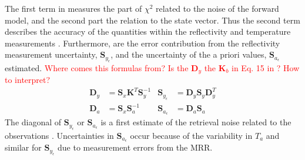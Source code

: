 %
The first term in  measures the part of $\chi^2$ related to the noise of the forward model, and the second part the relation to the state vector. Thus the second term describes the accuracy of the quantities within the reflectivity and temperature measurements \citep{rodgers_inverse_2000}.
Furthermore, are the error contribution from the reflectivity measurement uncertainty, $\mathbf{S}_{y_\epsilon}$, and the uncertainty of the a priori values, $\mathbf{S}_{a_\epsilon}$ estimated. \textcolor{red}{Where comes this formulas from? Is the $\mathbf{D}_y$ the $\mathbf{K}_b$ in Eq. 15 in \cite{wood_characterization_2013}? How to interpret?}
%
\begin{align}
\mathbf{D}_y  & = \mathbf{S}_x \mathbf{K}^T \mathbf{S}_y^{-1} %
& \mathbf{S}_{y_\epsilon} & = \mathbf{D}_y \mathbf{S}_y \mathbf{D}_y^T \\
\mathbf{D}_a & = \mathbf{S}_x \mathbf{S}_a^{-1} %
& \mathbf{S}_{a_\epsilon} & = \mathbf{D}_a \mathbf{S}_a
\end{align}
The diagonal of $\mathbf{S}_{y_\epsilon}$ or $\mathbf{S}_{a_\epsilon}$ is a first estimate of the retrieval noise related to the observations \citep{rodgers_inverse_2000}. Uncertainties in $\mathbf{S}_{a_\epsilon}$ occur because of the variability in $T_a$ and similar for $\mathbf{S}_{y_\epsilon}$ due to measurement errors from the MRR.



